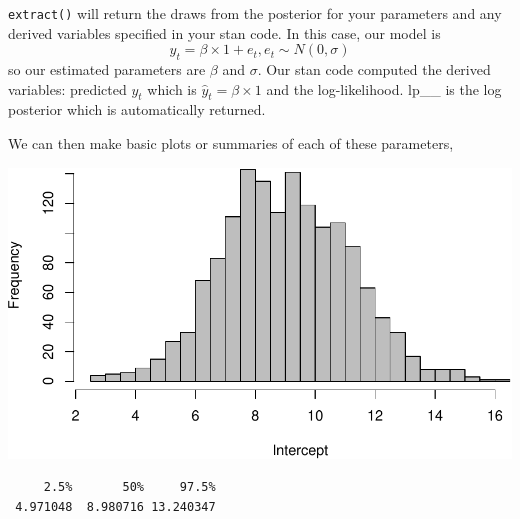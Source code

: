 \documentclass[
]{article}
\newenvironment{Shaded}{\begin{snugshade}}{\end{snugshade}}
\newcommand{\DataTypeTok}[1]{\textcolor[rgb]{0.13,0.29,0.53}{#1}}
\newcommand{\DecValTok}[1]{\textcolor[rgb]{0.00,0.00,0.81}{#1}}
\newcommand{\FloatTok}[1]{\textcolor[rgb]{0.00,0.00,0.81}{#1}}
\newcommand{\KeywordTok}[1]{\textcolor[rgb]{0.13,0.29,0.53}{\textbf{#1}}}
\newcommand{\NormalTok}[1]{#1}
\newcommand{\OperatorTok}[1]{\textcolor[rgb]{0.81,0.36,0.00}{\textbf{#1}}}
\newcommand{\StringTok}[1]{\textcolor[rgb]{0.31,0.60,0.02}{#1}}
\begin{document}
\texttt{extract()} will return the draws from the posterior for your
parameters and any derived variables specified in your stan code. In
this case, our model is
\[y_t = \beta \times 1 + e_t, e_t \sim N(0,\sigma)\] so our estimated
parameters are \(\beta\) and \(\sigma\). Our stan code computed the
derived variables: predicted \(y_t\) which is
\(\hat{y}_t = \beta \times 1\) and the log-likelihood. lp\_\_ is the log
posterior which is automatically returned.

We can then make basic plots or summaries of each of these parameters,

\begin{Shaded}
\end{Shaded}

\begin{center}\includegraphics[width=0.8\linewidth]{fitting-models-with-stan_files/figure-latex/stan-hist-1} \end{center}

\begin{Shaded}
\end{Shaded}

\begin{verbatim}
     2.5%       50%     97.5% 
 4.971048  8.980716 13.240347 
\end{verbatim}
\end{document}
